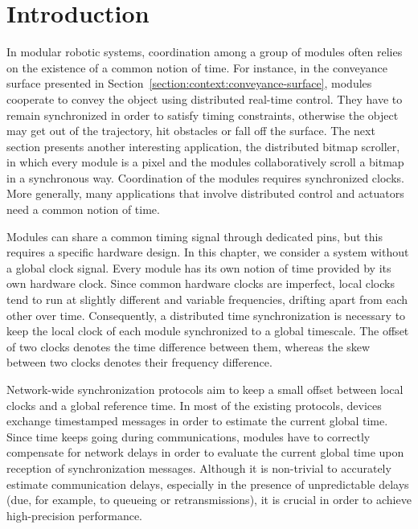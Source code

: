 \section{Introduction}

In modular robotic systems, coordination among a group of modules often relies on the existence of a common notion of time. For instance, in the conveyance surface presented in Section~\ref{section:context:conveyance-surface}, modules cooperate to convey the object using distributed real-time control. They have to remain synchronized in order to satisfy timing constraints, otherwise the object may get out of the trajectory, hit obstacles or fall off the surface. The next section presents another interesting application, the distributed bitmap scroller, in which every module is a pixel and the modules collaboratively scroll a bitmap in a synchronous way. Coordination of the modules requires synchronized clocks. More generally, many applications that involve distributed control and actuators need a common notion of time.

Modules can share a common timing signal through dedicated pins, but this requires a specific hardware design. In this chapter, we consider a system without a global clock signal. Every module has its own notion of time provided by its own hardware clock. Since common hardware clocks are imperfect, local clocks tend to run at slightly different and variable frequencies, drifting apart from each other over time. Consequently, a distributed time synchronization is necessary to keep the local clock of each module synchronized to a global timescale. The offset of two clocks denotes the time difference between them, whereas the skew between two clocks denotes their frequency difference.

Network-wide synchronization protocols aim to keep a small offset between local clocks and a global reference time. In most of the existing protocols, devices exchange timestamped messages in order to estimate the current global time. Since time keeps going during communications, modules have to correctly compensate for network delays in order to evaluate the current global time upon reception of synchronization messages. Although it is non-trivial to accurately estimate communication delays, especially in the presence of unpredictable delays (due, for example, to queueing or retransmissions), it is crucial in order to achieve high-precision performance.

